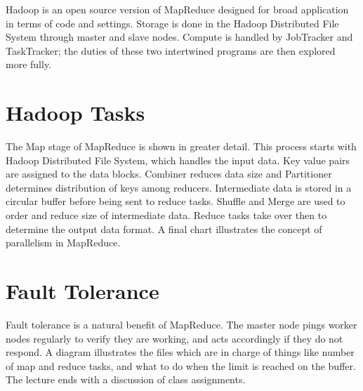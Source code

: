 Hadoop is an open source version of MapReduce designed for broad
application in terms of code and settings. Storage is done in the Hadoop
Distributed File System through master and slave nodes. Compute is
handled by JobTracker and TaskTracker; the duties of these two
intertwined programs are then explored more fully.



\section{Hadoop Tasks}

The Map stage of MapReduce is shown in greater detail. This process
starts with Hadoop Distributed File System, which handles the input
data. Key value pairs are assigned to the data blocks. Combiner reduces
data size and Partitioner determines distribution of keys among
reducers. Intermediate data is stored in a circular buffer before being
sent to reduce tasks. Shuffle and Merge are used to order and reduce
size of intermediate data. Reduce tasks take over then to determine the
output data format. A final chart illustrates the concept of parallelism
in MapReduce.



\section{Fault Tolerance}

Fault tolerance is a natural benefit of MapReduce. The master node pings
worker nodes regularly to verify they are working, and acts accordingly
if they do not respond. A diagram illustrates the files which are in
charge of things like number of map and reduce tasks, and what to do
when the limit is reached on the buffer. The lecture ends with a
discussion of class assignments.



